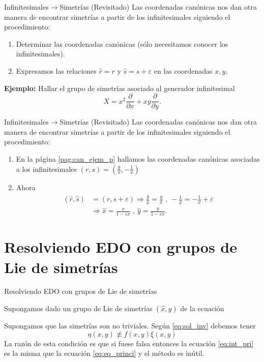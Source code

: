 \documentclass{article}
\renewcommand{\epsilon}{\varepsilon}
\begin{document}
{Infinitesimales$\to$Simetrías (Revisitado)}
Las coordenadas canónicas nos dan otra manera de encontrar simetrías a partir de los infinitesimales siguiendo el procedimiento:

\begin{enumerate}
\item Determinar las coordenadas canónicas  (sólo necesitamos conocer los infinitesimales).
\item Expresamos las relaciones $\hat{r}=r$ y $\hat{s}=s+\epsilon$ en las coordenadas $x,y$.
\end{enumerate}


\textbf{Ejemplo:} Hallar el grupo de simetrías asociado al generador infinitesimal
\[X=x^2\frac{\partial}{\partial x}+xy\frac{\partial}{\partial y}.\]


{Infinitesimales$\to$Simetrías (Revisitado)}
 Las coordenadas canónicas nos dan otra manera de encontrar simetrías a partir de los infinitesimales siguiendo el procedimiento:

\begin{enumerate}
\item En la página \ref{pag:can_ejem_p} hallamos las coordenadas canónicas asociadas a los infinitesimales $(r,s)=\left(\frac{y}{x},-\frac{1}{x}\right)$
\item Ahora
\[\begin{split}
(\hat{r},\hat{s})&=(r,s+\epsilon)\Rightarrow \frac{\hat{y}}{\hat{x}}=\frac{y}{x}\text{ , }-\frac{1}{\hat{x}}=-\frac{1}{x}+\epsilon\\
&\Rightarrow \hat{x}=\frac{x}{1-\epsilon x} \text{ , } \hat{y}=\frac{y}{1-\epsilon x}.
\end{split}
\] 
\end{enumerate}



\section[Resolviendo EDO]{Resolviendo EDO con grupos de Lie de simetrías}

{Resolviendo EDO con grupos de Lie de simetrías}

 Supongamos dado  un grupo de Lie de simetrías $(\hat{x},\hat{y})$ de la ecuación

 Supongamos  que las simetrías son no triviales. Según \eqref{eq:sol_inv} debemos tener
 \[\eta(x,y)\not\equiv f(x,y)\xi(x,y)\]
La razón de esta condición es que si fuese falsa entonces la ecuación \eqref{eq:int_pri} es la misma que la ecuación \eqref{eq:eq_princi} y el método es inútil.
\end{document}
